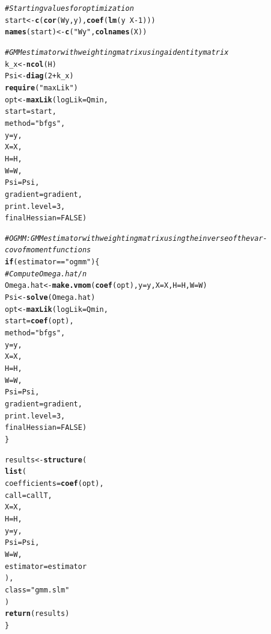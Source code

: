 \documentclass[english,12pt]{book}\usepackage[]{graphicx}\usepackage[]{xcolor}
\makeatletter
\newcommand{\hlnum}[1]{\textcolor[rgb]{0.686,0.059,0.569}{#1}}%
\newcommand{\hlsng}[1]{\textcolor[rgb]{0.192,0.494,0.8}{#1}}%
\newcommand{\hlcom}[1]{\textcolor[rgb]{0.678,0.584,0.686}{\textit{#1}}}%
\newcommand{\hlopt}[1]{\textcolor[rgb]{0,0,0}{#1}}%
\newcommand{\hldef}[1]{\textcolor[rgb]{0.345,0.345,0.345}{#1}}%
\newcommand{\hlkwa}[1]{\textcolor[rgb]{0.161,0.373,0.58}{\textbf{#1}}}%
\newcommand{\hlkwb}[1]{\textcolor[rgb]{0.69,0.353,0.396}{#1}}%
\newcommand{\hlkwc}[1]{\textcolor[rgb]{0.333,0.667,0.333}{#1}}%
\newcommand{\hlkwd}[1]{\textcolor[rgb]{0.737,0.353,0.396}{\textbf{#1}}}%
\newenvironment{kframe}{%
 \def\at@end@of@kframe{}%
 \ifinner\ifhmode%
  \def\at@end@of@kframe{\end{minipage}}%
  \begin{minipage}{\columnwidth}%
 \fi\fi%
 \def\FrameCommand##1{\hskip\@totalleftmargin \hskip-\fboxsep
 \colorbox{shadecolor}{##1}\hskip-\fboxsep
     \hskip-\linewidth \hskip-\@totalleftmargin \hskip\columnwidth}%
 \MakeFramed {\advance\hsize-\width
   \@totalleftmargin\z@ \linewidth\hsize
   \@setminipage}}%
 {\par\unskip\endMakeFramed%
 \at@end@of@kframe}
\newenvironment{knitrout}{}{} %
\makeatother
\begin{document}
\begin{knitrout}
\begin{kframe}
\begin{alltt}
  \hlcom{# Starting values for optimization}
  \hldef{start} \hlkwb{<-} \hlkwd{c}\hldef{(}\hlkwd{cor}\hldef{(Wy, y),} \hlkwd{coef}\hldef{(}\hlkwd{lm}\hldef{(y} \hlopt{~} \hldef{X} \hlopt{-} \hlnum{1}\hldef{)))}
  \hlkwd{names}\hldef{(start)} \hlkwb{<-} \hlkwd{c}\hldef{(}\hlsng{"Wy"}\hldef{,} \hlkwd{colnames}\hldef{(X))}

  \hlcom{# GMM estimator with weighting matrix using a identity matrix  }
  \hldef{k_x} \hlkwb{<-} \hlkwd{ncol}\hldef{(H)}
  \hldef{Psi} \hlkwb{<-} \hlkwd{diag}\hldef{(}\hlnum{2} \hlopt{+} \hldef{k_x)}
  \hlkwd{require}\hldef{(}\hlsng{"maxLik"}\hldef{)}
  \hldef{opt} \hlkwb{<-} \hlkwd{maxLik}\hldef{(}\hlkwc{logLik} \hldef{= Qmin,}
                \hlkwc{start} \hldef{= start,}
                \hlkwc{method} \hldef{=} \hlsng{"bfgs"}\hldef{,}
                \hlkwc{y} \hldef{= y,}
                \hlkwc{X} \hldef{= X,}
                \hlkwc{H} \hldef{= H,}
                \hlkwc{W} \hldef{= W,}
                \hlkwc{Psi} \hldef{= Psi,}
                \hlkwc{gradient} \hldef{= gradient,}
                \hlkwc{print.level} \hldef{=} \hlnum{3}\hldef{,}
                \hlkwc{finalHessian} \hldef{=} \hlnum{FALSE}\hldef{)}

  \hlcom{# OGMM: GMM estimator with weighting matrix using the inverse of the var-cov of moment functions}
  \hlkwa{if} \hldef{(estimator} \hlopt{==} \hlsng{"ogmm"}\hldef{)\{}
    \hlcom{# Compute Omega.hat/n}
    \hldef{Omega.hat} \hlkwb{<-} \hlkwd{make.vmom}\hldef{(}\hlkwd{coef}\hldef{(opt),} \hlkwc{y} \hldef{= y,} \hlkwc{X} \hldef{= X,} \hlkwc{H} \hldef{= H,} \hlkwc{W} \hldef{= W)}
    \hldef{Psi}  \hlkwb{<-} \hlkwd{solve}\hldef{(Omega.hat)}
    \hldef{opt} \hlkwb{<-} \hlkwd{maxLik}\hldef{(}\hlkwc{logLik} \hldef{= Qmin,}
                  \hlkwc{start} \hldef{=} \hlkwd{coef}\hldef{(opt),}
                  \hlkwc{method} \hldef{=} \hlsng{"bfgs"}\hldef{,}
                  \hlkwc{y} \hldef{= y,}
                  \hlkwc{X} \hldef{= X,}
                  \hlkwc{H} \hldef{= H,}
                  \hlkwc{W} \hldef{= W,}
                  \hlkwc{Psi} \hldef{= Psi,}
                  \hlkwc{gradient} \hldef{= gradient,}
                  \hlkwc{print.level} \hldef{=} \hlnum{3}\hldef{,}
                  \hlkwc{finalHessian} \hldef{=} \hlnum{FALSE}\hldef{)}
  \hldef{\}}


  \hldef{results} \hlkwb{<-} \hlkwd{structure}\hldef{(}
    \hlkwd{list}\hldef{(}
      \hlkwc{coefficients} \hldef{=} \hlkwd{coef}\hldef{(opt),}
      \hlkwc{call} \hldef{= callT,}
      \hlkwc{X} \hldef{= X,}
      \hlkwc{H} \hldef{= H,}
      \hlkwc{y} \hldef{= y,}
      \hlkwc{Psi} \hldef{= Psi,}
      \hlkwc{W} \hldef{= W,}
      \hlkwc{estimator} \hldef{= estimator}
    \hldef{),}
    \hlkwc{class} \hldef{=} \hlsng{"gmm.slm"}
  \hldef{)}
  \hlkwd{return}\hldef{(results)}
\hldef{\}}
\end{alltt}
\end{kframe}
\end{knitrout}
\end{document}
